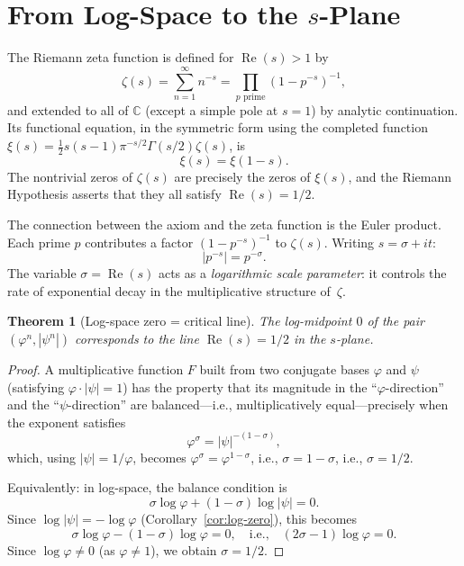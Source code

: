 \documentclass[12pt, a4paper]{article}
\theoremstyle{plain}
\newtheorem{theorem}{Theorem}[section]
\theoremstyle{definition}
\theoremstyle{remark}
\newcommand{\C}{\mathbb{C}}
\newcommand{\re}{\operatorname{Re}}
\newcommand{\vp}{\varphi}
\begin{document}
\section{From Log-Space to the $s$-Plane}\label{sec:translation}

The Riemann zeta function is defined for $\re(s) > 1$ by
\begin{equation}\label{eq:zeta-def}
  \zeta(s) = \sum_{n=1}^{\infty} n^{-s}
  = \prod_{p \text{ prime}} (1 - p^{-s})^{-1},
\end{equation}
and extended to all of $\C$ (except a simple pole at $s = 1$) by
analytic continuation.  Its functional equation, in the symmetric
form using the completed function
$\xi(s) = \tfrac{1}{2}s(s-1)\pi^{-s/2}\Gamma(s/2)\zeta(s)$, is
\begin{equation}\label{eq:func-eq}
  \xi(s) = \xi(1 - s).
\end{equation}
The nontrivial zeros of $\zeta(s)$ are precisely the zeros of
$\xi(s)$, and the Riemann Hypothesis asserts that they all satisfy
$\re(s) = 1/2$.

\medskip

The connection between the axiom and the zeta function is the
Euler product.  Each prime $p$ contributes a factor
$(1 - p^{-s})^{-1}$ to $\zeta(s)$.  Writing $s = \sigma + it$:
\[
  |p^{-s}| = p^{-\sigma}.
\]
The variable $\sigma = \re(s)$ acts as a \emph{logarithmic scale
parameter}: it controls the rate of exponential decay in the
multiplicative structure of~$\zeta$.

\begin{theorem}[Log-space zero = critical line]\label{thm:translation}
  The log-midpoint $0$ of the pair $(\vp^n, |\psi^n|)$ corresponds to
  the line $\re(s) = 1/2$ in the $s$-plane.
\end{theorem}

\begin{proof}
  A multiplicative function $F$ built from two conjugate bases $\vp$
  and $\psi$ (satisfying $\vp \cdot |\psi| = 1$) has the property
  that its magnitude in the ``$\vp$-direction'' and the
  ``$\psi$-direction'' are balanced---i.e., multiplicatively
  equal---precisely when the exponent satisfies
  \[
    \vp^\sigma = |\psi|^{-(1-\sigma)},
  \]
  which, using $|\psi| = 1/\vp$, becomes
  $\vp^\sigma = \vp^{1-\sigma}$, i.e., $\sigma = 1 - \sigma$,
  i.e., $\sigma = 1/2$.

  Equivalently: in log-space, the balance condition is
  \[
    \sigma \log \vp + (1-\sigma) \log |\psi| = 0.
  \]
  Since $\log |\psi| = -\log \vp$
  (Corollary~\ref{cor:log-zero}), this becomes
  \[
    \sigma \log \vp - (1-\sigma) \log \vp = 0,
    \quad\text{i.e.,}\quad
    (2\sigma - 1)\log \vp = 0.
  \]
  Since $\log \vp \neq 0$ (as $\vp \neq 1$), we obtain
  $\sigma = 1/2$.
\end{proof}
\end{document}

